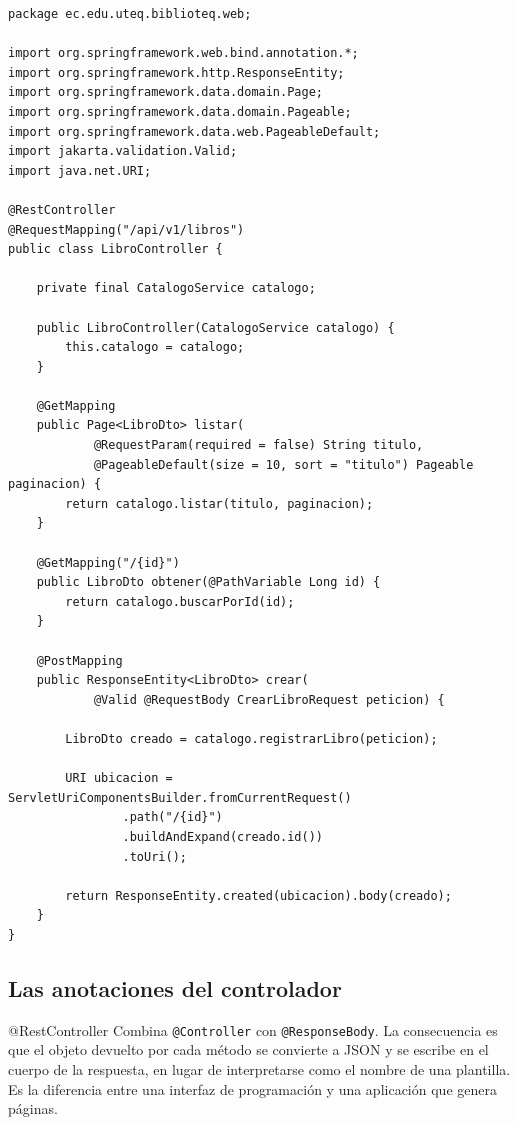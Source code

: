 \documentclass[11pt,a4paper,openany]{book}
\begin{document}
\begin{lstlisting}[style=java,caption={Controlador REST del catalogo de libros.},label={lst:controlador}]
package ec.edu.uteq.biblioteq.web;

import org.springframework.web.bind.annotation.*;
import org.springframework.http.ResponseEntity;
import org.springframework.data.domain.Page;
import org.springframework.data.domain.Pageable;
import org.springframework.data.web.PageableDefault;
import jakarta.validation.Valid;
import java.net.URI;

@RestController
@RequestMapping("/api/v1/libros")
public class LibroController {

	private final CatalogoService catalogo;

	public LibroController(CatalogoService catalogo) {
		this.catalogo = catalogo;
	}

	@GetMapping
	public Page<LibroDto> listar(
			@RequestParam(required = false) String titulo,
			@PageableDefault(size = 10, sort = "titulo") Pageable paginacion) {
		return catalogo.listar(titulo, paginacion);
	}

	@GetMapping("/{id}")
	public LibroDto obtener(@PathVariable Long id) {
		return catalogo.buscarPorId(id);
	}

	@PostMapping
	public ResponseEntity<LibroDto> crear(
			@Valid @RequestBody CrearLibroRequest peticion) {

		LibroDto creado = catalogo.registrarLibro(peticion);

		URI ubicacion = ServletUriComponentsBuilder.fromCurrentRequest()
				.path("/{id}")
				.buildAndExpand(creado.id())
				.toUri();

		return ResponseEntity.created(ubicacion).body(creado);
	}
}
\end{lstlisting}

\subsection{Las anotaciones del controlador}
\label{sec:anotaciones-controlador}

\begin{cajadefinicion}{@RestController}
	Combina \texttt{@Controller} con \texttt{@ResponseBody}. La consecuencia es que el objeto devuelto por cada método se convierte a JSON y se escribe en el cuerpo de la respuesta, en lugar de interpretarse como el nombre de una plantilla. Es la diferencia entre una interfaz de programación y una aplicación que genera páginas.
\end{cajadefinicion}
\end{document}
